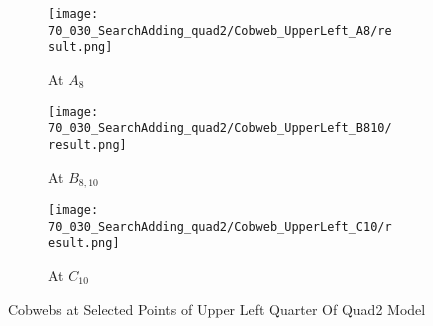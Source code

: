 \begin{figure}
    \centering
    \begin{subfigure}{0.3\textwidth}
        \centering
        \texttt{[image: 70\_030\_SearchAdding\_quad2/Cobweb\_UpperLeft\_A8/result.png]}
        \caption{At $A_{8}$}
    \end{subfigure}
    \begin{subfigure}{0.3\textwidth}
        \centering
        \texttt{[image: 70\_030\_SearchAdding\_quad2/Cobweb\_UpperLeft\_B810/result.png]}
        \caption{At $B_{8, 10}$}
    \end{subfigure}
    \begin{subfigure}{0.3\textwidth}
        \centering
        \texttt{[image: 70\_030\_SearchAdding\_quad2/Cobweb\_UpperLeft\_C10/result.png]}
        \caption{At $C_{10}$}
    \end{subfigure}
    \caption{Cobwebs at Selected Points of Upper Left Quarter Of Quad2 Model}
\end{figure}